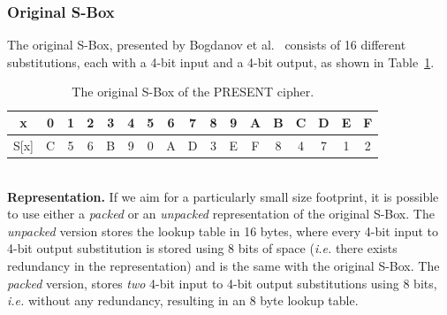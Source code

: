 \documentclass[11pt]{llncs2e} %
\begin{document}
\subsubsection{Original S-Box}\label{osbox}
The original S-Box, presented by Bogdanov et al.~\cite{bogdanov2007present} consists of 16 different substitutions, each with a 4-bit input and a 4-bit output, as shown in Table~\ref{original_sbox}.
\begin{table}[h]
\footnotesize
\centering
\begin{tabular}{| c | c  | c | c | c  | c | c | c  | c | c | c  | c | c | c  | c | c | c |}
\hline
  x & 0 & 1 & 2 & 3 & 4 & 5 & 6 & 7 & 8 & 9 & A & B & C & D & E & F   \\
\hline
  S[x] & C & 5 & 6 & B & 9 & 0 & A & D & 3 & E & F & 8 & 4 & 7 & 1 & 2   \\
\hline
\end{tabular}
 \caption{\footnotesize The original S-Box of the PRESENT cipher.}
 \label{original_sbox}
\end{table}\\
\textbf{Representation.} If we aim for a particularly small size footprint, it is possible to use either a \emph{packed} or an \emph{unpacked} representation of the original S-Box. The \emph{unpacked} version stores the lookup table in 16 bytes, where every 4-bit input to 4-bit output substitution is stored using 8 bits of space (\emph{i.e.} there exists redundancy in the representation) and is the same with the original S-Box. The \emph{packed} version, stores \emph{two} 4-bit input to 4-bit output substitutions using 8 bits, \emph{i.e.} without any redundancy, resulting in an 8 byte lookup table. \\
\end{document}
